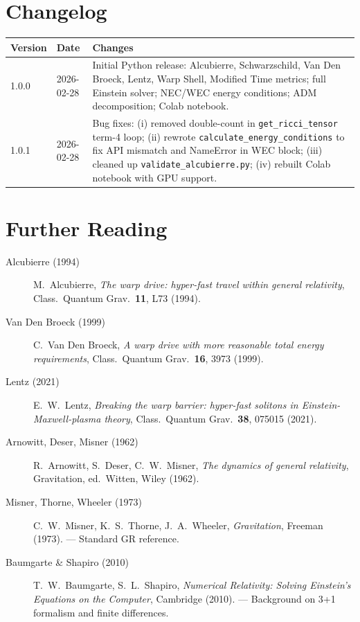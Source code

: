 \documentclass[11pt, a4paper, twoside]{report}
\begin{document}
\chapter{Changelog}
\label{app:changelog}

\begin{center}
\begin{tabularx}{\linewidth}{llX}
  \toprule
  Version & Date & Changes \\
  \midrule
  1.0.0 & 2026-02-28 &
  Initial Python release: Alcubierre, Schwarzschild, Van Den Broeck,
  Lentz, Warp Shell, Modified Time metrics; full Einstein solver;
  NEC/WEC energy conditions; ADM decomposition; Colab notebook. \\[0.3em]

  1.0.1 & 2026-02-28 &
  Bug fixes: (i) removed double-count in \texttt{get\_ricci\_tensor}
  term-4 loop; (ii) rewrote \texttt{calculate\_energy\_conditions} to
  fix API mismatch and NameError in WEC block; (iii) cleaned up
  \texttt{validate\_alcubierre.py}; (iv) rebuilt Colab notebook with
  GPU support. \\
  \bottomrule
\end{tabularx}
\end{center}

\chapter{Further Reading}
\label{app:refs}

\begin{description}
  \item[Alcubierre (1994)]
    M.~Alcubierre, \textit{The warp drive: hyper-fast travel within
    general relativity}, Class.\ Quantum Grav.\ \textbf{11}, L73 (1994).

  \item[Van Den Broeck (1999)]
    C.~Van Den Broeck, \textit{A warp drive with more reasonable total
    energy requirements}, Class.\ Quantum Grav.\ \textbf{16}, 3973 (1999).

  \item[Lentz (2021)]
    E.~W.~Lentz, \textit{Breaking the warp barrier: hyper-fast solitons
    in Einstein-Maxwell-plasma theory}, Class.\ Quantum Grav.\ \textbf{38},
    075015 (2021).

  \item[Arnowitt, Deser, Misner (1962)]
    R.~Arnowitt, S.~Deser, C.~W.~Misner, \textit{The dynamics of
    general relativity}, Gravitation, ed.\ Witten, Wiley (1962).

  \item[Misner, Thorne, Wheeler (1973)]
    C.~W.~Misner, K.~S.~Thorne, J.~A.~Wheeler, \textit{Gravitation},
    Freeman (1973). — Standard GR reference.

  \item[Baumgarte \& Shapiro (2010)]
    T.~W.~Baumgarte, S.~L.~Shapiro, \textit{Numerical Relativity:
    Solving Einstein's Equations on the Computer}, Cambridge (2010).
    — Background on 3+1 formalism and finite differences.
\end{description}
\end{document}
